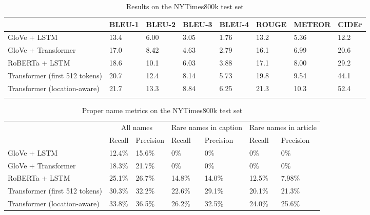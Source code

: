 \documentclass[10pt,twocolumn,letterpaper]{article}
\begin{document}
\begin{table*}[t]
	\caption {Results on the NYTimes800k test set}
	\label{tab:results-nytimes}
	\centering
	\begin{tabular}{llllllll}
		\toprule
		  & BLEU-1  & BLEU-2 & BLEU-3 & BLEU-4 & ROUGE & METEOR & CIDEr \\
      \midrule
      GloVe + LSTM & 13.4 & 6.00 & 3.05 & 1.76 & 13.2 & 5.36 & 12.2 \\ %
      GloVe + Transformer & 17.0 & 8.42 & 4.63 & 2.79 & 16.1 & 6.99 & 20.6 \\ %
      RoBERTa + LSTM & 18.6 & 10.1 & 6.03 & 3.88 & 17.1 & 8.00 & 29.2 \\
      Transformer (first 512 tokens) & 20.7 & 12.4 & 8.14 & 5.73 & 19.8 & 9.54 & 44.1 \\ %
      Transformer (location-aware) & 21.7 & 13.3 & 8.84 & 6.25 & 21.3 & 10.3 & 52.4 \\ %
      \\
		\bottomrule
	\end{tabular}
\end{table*}

\begin{table*}[t]
	\caption {Proper name metrics on the NYTimes800k test set}
	\label{tab:results-names}
	\centering
	\begin{tabular}{lllllll}
		\toprule
        & \multicolumn{2}{c}{All names} & \multicolumn{2}{c}{Rare names in caption } & \multicolumn{2}{c}{Rare names in article } \\
        & Recall  & Precision & Recall  & Precision & Recall  & Precision \\
      \midrule
      GloVe + LSTM & 12.4\% & 15.6\% & 0\% & 0\% & 0\% & 0\%  \\
      GloVe + Transformer & 18.3\% & 21.7\% & 0\% & 0\% & 0\% & 0\%  \\
      RoBERTa + LSTM & 25.1\% & 26.7\% & 14.8\% & 14.0\% & 12.5\% & 7.98\%  \\
      Transformer (first 512 tokens) & 30.3\% & 32.2\% & 22.6\% & 29.1\% & 20.1\% & 21.3\%  \\
      Transformer (location-aware) & 33.8\% & 36.5\% & 26.2\% & 32.5\% & 24.0\% & 25.6\%   \\
		\bottomrule
	\end{tabular}
\end{table*}
\end{document}
